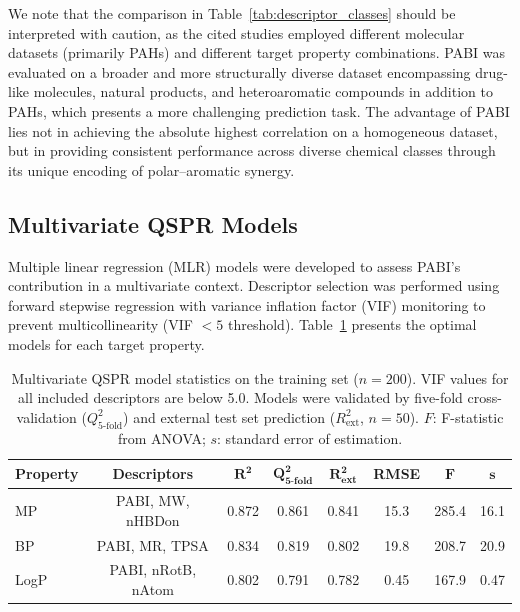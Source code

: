 \documentclass[12pt,a4paper]{article}
\begin{document}
We note that the comparison in Table~\ref{tab:descriptor_classes} should be interpreted with caution, as the cited studies employed different molecular datasets (primarily PAHs) and different target property combinations. PABI was evaluated on a broader and more structurally diverse dataset encompassing drug-like molecules, natural products, and heteroaromatic compounds in addition to PAHs, which presents a more challenging prediction task. The advantage of PABI lies not in achieving the absolute highest correlation on a homogeneous dataset, but in providing consistent performance across diverse chemical classes through its unique encoding of polar--aromatic synergy.

\subsection{Multivariate QSPR Models}

Multiple linear regression (MLR) models were developed to assess PABI's contribution in a multivariate context. Descriptor selection was performed using forward stepwise regression with variance inflation factor (VIF) monitoring to prevent multicollinearity (VIF $< 5$ threshold)\cite{tropsha2010best}. Table~\ref{tab:multivariate} presents the optimal models for each target property.

\begin{table}[H]
\centering
\caption{Multivariate QSPR model statistics on the training set ($n = 200$). VIF values for all included descriptors are below 5.0. Models were validated by five-fold cross-validation ($Q^2_{5\text{-fold}}$) and external test set prediction ($R^2_{\text{ext}}$, $n = 50$). $F$: F-statistic from ANOVA; $s$: standard error of estimation.}
\label{tab:multivariate}
\begin{tabular}{@{}lccccccc@{}}
\toprule
\textbf{Property} & \textbf{Descriptors} & $\mathbf{R^2}$ & $\mathbf{Q^2_{5\text{-fold}}}$ & $\mathbf{R^2_{\text{ext}}}$ & \textbf{RMSE} & $\mathbf{F}$ & $\mathbf{s}$ \\
\midrule
MP & PABI, MW, nHBDon & 0.872 & 0.861 & 0.841 & 15.3 & 285.4 & 16.1 \\
BP & PABI, MR, TPSA & 0.834 & 0.819 & 0.802 & 19.8 & 208.7 & 20.9 \\
LogP & PABI, nRotB, nAtom & 0.802 & 0.791 & 0.782 & 0.45 & 167.9 & 0.47 \\
\bottomrule
\end{tabular}
\end{table}
\end{document}

